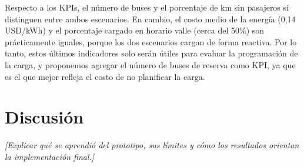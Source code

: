 Respecto a los KPIs, el número de buses y el porcentaje de km sin pasajeros sí distinguen entre ambos escenarios. En cambio, el costo medio de la energía (0,14 USD/kWh) y el porcentaje cargado en horario valle (cerca del 50\%) son prácticamente iguales, porque los dos escenarios cargan de forma reactiva. Por lo tanto, estos últimos indicadores solo serán útiles para evaluar la programación de la carga, y proponemos agregar el número de buses de reserva como KPI, ya que es el que mejor refleja el costo de no planificar la carga.

\section{Discusión}
\textit{[Explicar qué se aprendió del prototipo, sus límites y cómo los
resultados orientan la implementación final.]}